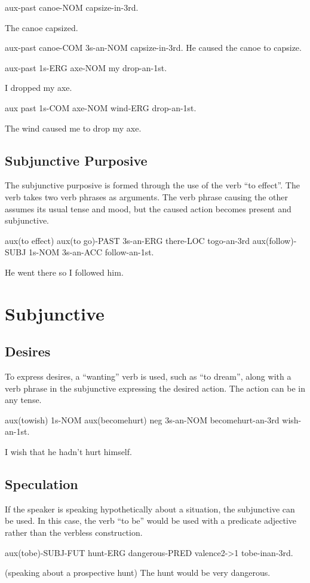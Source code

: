 aux-past canoe-NOM capsize-in-3rd.

The canoe capsized.

aux-past canoe-COM 3s-an-NOM capsize-in-3rd.
He caused the canoe to capsize.

aux-past 1s-ERG axe-NOM my drop-an-1st.

I dropped my axe.

aux past 1s-COM axe-NOM wind-ERG drop-an-1st.

The wind caused me to drop my axe.

\subsection{Subjunctive Purposive}

The subjunctive purposive is formed through the use of the verb ``to effect''.
The verb takes two verb phrases as arguments. The verb phrase causing the other
assumes its usual tense and mood, but the caused action becomes present and
subjunctive.

aux(to effect) aux(to go)-PAST 3s-an-ERG there-LOC togo-an-3rd aux(follow)-SUBJ
1s-NOM 3s-an-ACC follow-an-1st.

He went there so I followed him.

\section{Subjunctive}

\subsection{Desires}

To express desires, a ``wanting'' verb is used, such as ``to dream'', along with
a verb phrase in the subjunctive expressing the desired action. The action can
be in any tense.

aux(towish) 1s-NOM aux(becomehurt) neg 3s-an-NOM becomehurt-an-3rd wish-an-1st.

I wish that he hadn't hurt himself.

\subsection{Speculation}

If the speaker is speaking hypothetically about a situation, the subjunctive can
be used. In this case, the verb ``to be'' would be used with a predicate
adjective rather than the verbless construction.

aux(tobe)-SUBJ-FUT hunt-ERG dangerous-PRED valence2->1 tobe-inan-3rd.

(speaking about a prospective hunt) The hunt would be very dangerous.
